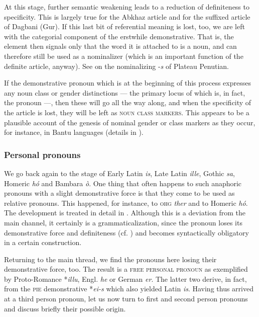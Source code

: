 At this stage, further semantic weakening leads to a reduction of definiteness to specificity. This is largely true for the Abkhaz article and for the suffixed article of Dagbani (Gur). If this last bit of referential meaning is lost, too, we are left with the categorial component of the erstwhile demonstrative. That is, the element then signals only that the word it is attached to is a noun, and can therefore still be used as a nominalizer (which is an important function of the definite article, anyway). See \citealt[§~3.5]{Greenberg1978} on the nominalizing -\textit{s} of Plateau Penutian.\label{PlateauPenutian}

If the demonstrative pronoun which is at the beginning of this process expresses any noun class or gender distinctions — the primary locus of which is, in fact, the pronoun —, then these will go all the way along, and when the specificity of the article is lost, they will be left as \textsc{noun class markers}. This appears to be a plausible account of the genesis of nominal gender or class markers as they occur, for instance, in Bantu languages (details in \citealt[§~7.2]{Lehmann1982b}).

\subsubsection{Personal pronouns} \label{sec:3.2.1.2}
We go back again to the stage of Early Latin \textit{is}, Late Latin \textit{ille}, Gothic \textit{sa}, Homeric \textit{hó} and Bambara \textit{ò}. One thing that often happens to such anaphoric pronouns with a slight demonstrative force is that they come to be used as relative pronouns. This happened, for instance, to \textsc{ohg} \textit{ther} and to Homeric \textit{hó}. The development is treated in detail in \citet[Ch.~\textsc{vi}.1.1.2 and 1.2.2]{Lehmann1984}. Although this is a deviation from the main channel, it certainly is a grammaticalization, since the pronoun loses its demonstrative force and definiteness (cf. \citealt[Ch. \textsc{v}.2.3, § 2]{Lehmann1984}) and becomes syntactically obligatory in a certain construction.

Returning to the main thread, we find the pronouns here losing their demonstrative force, too. The result is a \textsc{free personal pronoun} as exemplified by Proto-Romance *\textit{illu}, Engl. \textit{he} or German \textit{er}. The latter two derive, in fact, from the \textsc{pie} demonstrative *\textit{ei-s} which also yielded Latin \textit{is}. Having thus arrived at a third person pronoun, let us now turn to first and second person pronouns and discuss briefly their possible origin.

